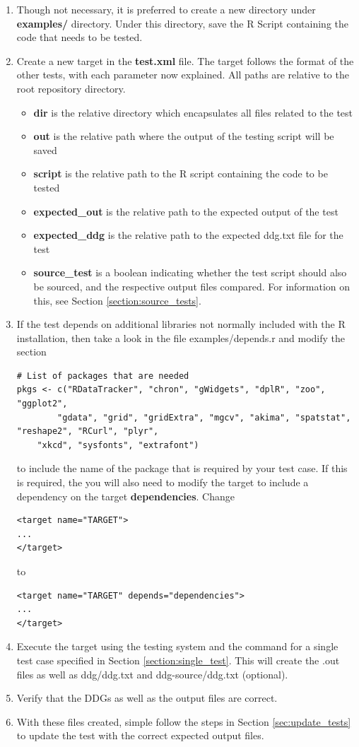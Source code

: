 \documentclass[12pt]{article}
\begin{document}
\begin{enumerate}
\item Though not necessary, it is preferred to create a new directory under \textbf{examples/} directory. Under this directory, save the R Script containing the code that needs to be tested.
\item Create a new target in the \textbf{test.xml} file. The target follows the format of the other tests, with each parameter now explained. All paths are relative to the root repository directory.
\begin{itemize}
\item \textbf{dir} is the relative directory which encapsulates all files related to the test
\item \textbf{out} is the relative path where the output of the testing script will be saved
\item \textbf{script} is the relative path to the R script containing the code to be tested
\item \textbf{expected\_out} is the relative path to the expected output of the test 
\item \textbf{expected\_ddg} is the relative path to the expected ddg.txt file for the test
\item \textbf{source\_test} is a boolean indicating whether the test script should also be sourced, and the respective output files compared. For information on this, see Section \ref{section:source_tests}.
\end{itemize}
\item If the test depends on additional libraries not normally included with the R installation, then take a look in the file examples/depends.r and modify the section 
\begin{lstlisting}
# List of packages that are needed 
pkgs <- c("RDataTracker", "chron", "gWidgets", "dplR", "zoo", "ggplot2",
		"gdata", "grid", "gridExtra", "mgcv", "akima", "spatstat", "reshape2", "RCurl", "plyr",
    "xkcd", "sysfonts", "extrafont")
\end{lstlisting}
to include the name of the package that is required by your test case. If this is required, the you will also need to modify the target to include a dependency on the target \textbf{dependencies}. Change
\begin{lstlisting}
<target name="TARGET">
...
</target>
\end{lstlisting}
to
\begin{lstlisting}
<target name="TARGET" depends="dependencies">
...
</target>
\end{lstlisting}
\item Execute the target using the testing system and the command for a single test case specified in Section \ref{section:single_test}. This will create the .out files as well as ddg/ddg.txt and ddg-source/ddg.txt (optional).
\item Verify that the DDGs as well as the output files are correct.
\item  With these files created, simple follow the steps in Section \ref{sec:update_tests} to update the test with the correct expected output files.
\end{enumerate}
\end{document}
